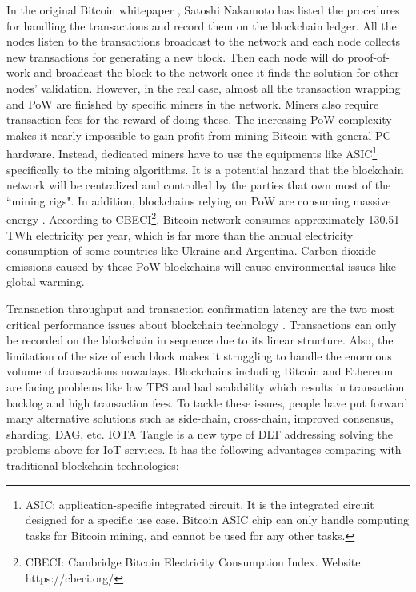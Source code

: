In the original Bitcoin whitepaper \cite{nakamoto2008peer}, Satoshi Nakamoto has listed the procedures for handling the transactions and record them on the blockchain ledger.
All the nodes listen to the transactions broadcast to the network and each node collects new transactions for generating a new block.
Then each node will do proof-of-work and broadcast the block to the network once it finds the solution for other nodes' validation.
However, in the real case, almost all the transaction wrapping and PoW are finished by specific miners in the network. Miners also require transaction fees for the reward of doing these.
The increasing PoW complexity makes it nearly impossible to gain profit from mining Bitcoin with general PC hardware. Instead, dedicated miners have to use the equipments like ASIC\footnote{ASIC: application-specific integrated circuit. It is the integrated circuit designed for a specific use case. Bitcoin ASIC chip can only handle computing tasks for Bitcoin mining, and cannot be used for any other tasks.} specifically to the mining algorithms.
It is a potential hazard that the blockchain network will be centralized and controlled by the parties that own most of the ``mining rigs". In addition, blockchains relying on PoW are consuming massive energy \cite{sedlmeir2020energy}. According to CBECI\footnote{CBECI: Cambridge Bitcoin Electricity Consumption Index. Website: https://cbeci.org/}, Bitcoin network consumes approximately 130.51 TWh electricity per year, which is far more than the annual electricity consumption of some countries like Ukraine and Argentina. Carbon dioxide emissions caused by these PoW blockchains will cause environmental issues like global warming.


Transaction throughput and transaction confirmation latency are the two most critical performance issues about blockchain technology \cite{zhou2020solutions}.
Transactions can only be recorded on the blockchain in sequence due to its linear structure. Also, the limitation of the size of each block makes it struggling to handle the enormous volume of transactions nowadays.
Blockchains including Bitcoin and Ethereum are facing problems like low TPS and bad scalability which results in transaction backlog and high transaction fees.
To tackle these issues, people have put forward many alternative solutions such as side-chain, cross-chain, improved consensus, sharding, DAG, etc.
IOTA Tangle is a new type of DLT addressing solving the problems above for IoT services. It has the following advantages comparing with traditional blockchain technologies:

